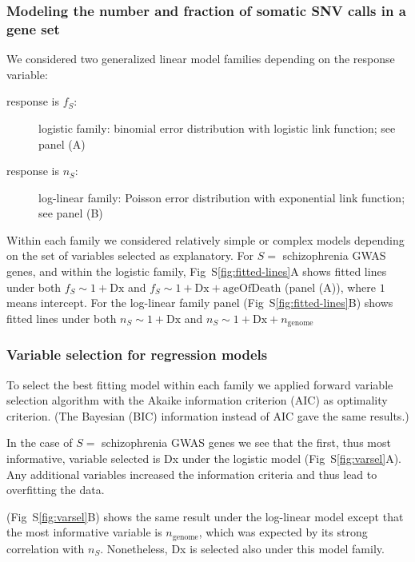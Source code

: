 \documentclass[letterpaper]{article}
\begin{document}
\subsubsection*{Modeling the number and fraction of somatic SNV calls in a gene set}

We considered two generalized linear model families depending on the response
variable:
\begin{description}
\item[response is \(f_S\):] logistic family: binomial error distribution with
	logistic link function; see panel (A)
\item[response is \(n_S\):] log-linear family: Poisson error distribution with exponential link function; see panel (B)
\end{description}

Within each family we considered relatively simple or complex models depending
on the set of variables selected as explanatory.  For \(S =\) schizophrenia
GWAS genes, and within the
logistic family, Fig~S\ref{fig:fitted-lines}A shows fitted lines under both \(f_S \sim 1 +
	\mathrm{Dx}\) and \(f_S \sim 1 + \mathrm{Dx} + \mathrm{ageOfDeath}\)
(panel (A)), where \(1\) means intercept.  For the log-linear family panel
(Fig~S\ref{fig:fitted-lines}B)
shows fitted lines under both \(n_S \sim 1 + \mathrm{Dx}\) and \(n_S \sim 1 +
	\mathrm{Dx} + n_\mathrm{genome}\)


\subsubsection*{Variable selection for regression models}

To select the best fitting model within each family we applied forward
variable selection algorithm with the Akaike information criterion (AIC) as
optimality criterion.  (The Bayesian (BIC) information instead of AIC gave the
same results.)

In the case of \(S =\) schizophrenia GWAS genes we see that the first,
thus most informative, variable selected is Dx under the logistic model
(Fig~S\ref{fig:varsel}A).
Any additional variables increased the information criteria and thus lead to
overfitting the data.

(Fig~S\ref{fig:varsel}B) shows the same result under the log-linear model except that the
most informative variable is \(n_\mathrm{genome}\), which was expected by its
strong correlation with \(n_S\).  Nonetheless, Dx is selected also under this
model family.
\end{document}
